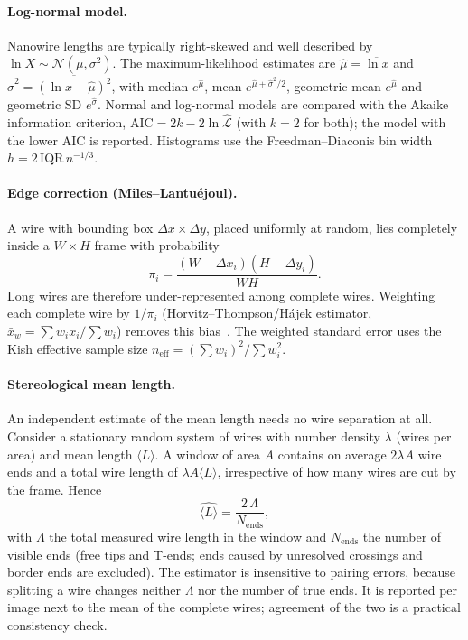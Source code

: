 \documentclass[11pt,a4paper]{article}
\begin{document}
\paragraph{Log-normal model.} Nanowire lengths are typically right-skewed and well described by $\ln X\sim\mathcal N(\mu,\sigma^2)$. The maximum-likelihood estimates are $\hat\mu=\overline{\ln x}$ and $\hat\sigma^2=\overline{(\ln x-\hat\mu)^2}$, with median $e^{\hat\mu}$, mean $e^{\hat\mu+\hat\sigma^2/2}$, geometric mean $e^{\hat\mu}$ and geometric SD $e^{\hat\sigma}$. Normal and log-normal models are compared with the Akaike information criterion, $\mathrm{AIC}=2k-2\ln\hat{\mathcal L}$ (with $k=2$ for both); the model with the lower AIC is reported. Histograms use the Freedman--Diaconis bin width $h=2\,\mathrm{IQR}\,n^{-1/3}$.

\paragraph{Edge correction (Miles--Lantuéjoul).} A wire with bounding box $\Delta x\times\Delta y$, placed uniformly at random, lies completely inside a $W\times H$ frame with probability
\begin{equation}
\pi_i=\frac{(W-\Delta x_i)(H-\Delta y_i)}{WH}.
\end{equation}
Long wires are therefore under-represented among complete wires. Weighting each complete wire by $1/\pi_i$ (Horvitz--Thompson/Hájek estimator, $\bar x_w=\sum w_ix_i/\sum w_i$) removes this bias~\cite{miles1978,lantuejoul1980}. The weighted standard error uses the Kish effective sample size $n_{\text{eff}}=(\sum w_i)^2/\sum w_i^2$.

\paragraph{Stereological mean length.} An independent estimate of the mean length needs no wire separation at all. Consider a stationary random system of wires with number density $\lambda$ (wires per area) and mean length $\langle L\rangle$. A window of area $A$ contains on average $2\lambda A$ wire ends and a total wire length of $\lambda A\langle L\rangle$, irrespective of how many wires are cut by the frame. Hence
\begin{equation}
\widehat{\langle L\rangle}=\frac{2\,\Lambda}{N_{\text{ends}}},
\end{equation}
with $\Lambda$ the total measured wire length in the window and $N_{\text{ends}}$ the number of visible ends (free tips and T-ends; ends caused by unresolved crossings and border ends are excluded). The estimator is insensitive to pairing errors, because splitting a wire changes neither $\Lambda$ nor the number of true ends. It is reported per image next to the mean of the complete wires; agreement of the two is a practical consistency check.
\end{document}
